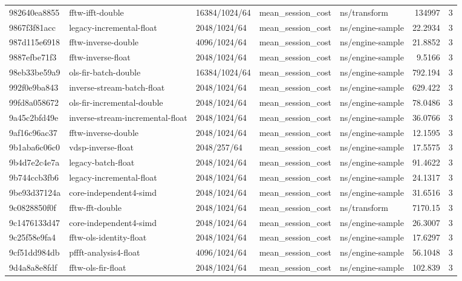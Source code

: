 \begin{longtable}{lllllrr}
982640ea8855 & fftw-ifft-double & 16384/1024/64 & mean\_session\_cost & ns/transform & 134997 & 3 \\
9867f3f81acc & legacy-incremental-float & 2048/1024/64 & mean\_session\_cost & ns/engine-sample & 22.2934 & 3 \\
987d115e6918 & fftw-inverse-double & 4096/1024/64 & mean\_session\_cost & ns/engine-sample & 21.8852 & 3 \\
9887efbe71f3 & fftw-inverse-float & 2048/1024/64 & mean\_session\_cost & ns/engine-sample & 9.5166 & 3 \\
98eb33be59a9 & ols-fir-batch-double & 16384/1024/64 & mean\_session\_cost & ns/engine-sample & 792.194 & 3 \\
992f0e9ba843 & inverse-stream-batch-float & 2048/1024/64 & mean\_session\_cost & ns/engine-sample & 629.422 & 3 \\
99fd8a058672 & ols-fir-incremental-double & 2048/1024/64 & mean\_session\_cost & ns/engine-sample & 78.0486 & 3 \\
9a45c2bfd49e & inverse-stream-incremental-float & 2048/1024/64 & mean\_session\_cost & ns/engine-sample & 36.0766 & 3 \\
9af16c96ac37 & fftw-inverse-double & 2048/1024/64 & mean\_session\_cost & ns/engine-sample & 12.1595 & 3 \\
9b1aba6c06c0 & vdsp-inverse-float & 2048/257/64 & mean\_session\_cost & ns/engine-sample & 17.5575 & 3 \\
9b4d7e2c4e7a & legacy-batch-float & 2048/1024/64 & mean\_session\_cost & ns/engine-sample & 91.4622 & 3 \\
9b744ccb3fb6 & legacy-incremental-float & 2048/1024/64 & mean\_session\_cost & ns/engine-sample & 24.1317 & 3 \\
9be93d37124a & core-independent4-simd & 2048/1024/64 & mean\_session\_cost & ns/engine-sample & 31.6516 & 3 \\
9c0828850f0f & fftw-fft-double & 2048/1024/64 & mean\_session\_cost & ns/transform & 7170.15 & 3 \\
9c1476133d47 & core-independent4-simd & 2048/1024/64 & mean\_session\_cost & ns/engine-sample & 26.3007 & 3 \\
9c25f58e9fa4 & fftw-ols-identity-float & 2048/1024/64 & mean\_session\_cost & ns/engine-sample & 17.6297 & 3 \\
9cf51dd984db & pffft-analysis4-float & 4096/1024/64 & mean\_session\_cost & ns/engine-sample & 56.1048 & 3 \\
9d4a8a8e8fdf & fftw-ols-fir-float & 2048/1024/64 & mean\_session\_cost & ns/engine-sample & 102.839 & 3 \\

\end{longtable}
